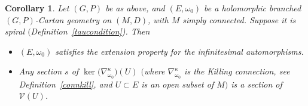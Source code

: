 \documentclass[pdftex]{sigma}
\numberwithin{equation}{section}
\newtheorem{Corollary}[Theorem]{Corollary}
\begin{document}
\begin{Corollary}\label{proprextaffine} Let $(G,P)$ be as above, and $(E,\omega_0)$ be a holomorphic branched $(G,P)$-Cartan geometry on $(M,D)$, with $M$ simply connected. Suppose it is spiral $($Definition~{\rm \ref{taucondition})}. Then
\begin{itemize}\itemsep=0pt
\item[$(1)$] $(E,\omega_0)$ satisfies the extension property for the infinitesimal automorphisms.
\item[$(2)$] Any section $s$ of $\ker\big(\nabla^\kappa_{\omega_0}\big)(U)$ $($where $\nabla^\kappa_{\omega_0}$ is the Killing connection, see Definition~{\rm \ref{connkill}}, and $U\subset E$ is an open subset of $M)$ is a section of $\mathcal{V}(U)$.
\end{itemize}\end{Corollary}
\end{document}

